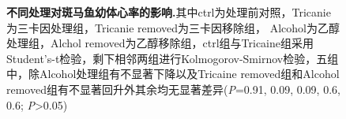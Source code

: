\documentclass[UTF-8,10.5pt]{ctexart}
\begin{document}
    \begin{figure}[htbp]
        \label{fig1}
        \centering
        \caption[]{\textbf{不同处理对斑马鱼幼体心率的影响.}其中ctrl为处理前对照，Tricanie为三卡因处理组，Tricanie removed为三卡因移除组，
        Alcohol为乙醇处理组，Alchol removed为乙醇移除组，ctrl组与Tricaine组采用Student's-t检验，剩下相邻两组进行Kolmogorov-Smirnov检验，五组中，除Alcohol处理组有不显著下降以及Tricaine removed组和Alcohol removed组有不显著回升外其余均无显著差异(\textit{P}=0.91, 0.09, 0.09, 0.6, 0.6; \textit{P}>0.05)}
    \end{figure}
\end{document}
